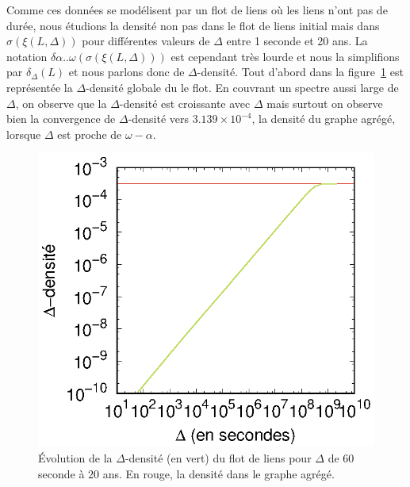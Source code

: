 Comme ces données se modélisent par un flot de liens où les liens n'ont pas de durée, nous étudions la densité non pas dans le flot de liens initial mais dans $\sigma(\xi(L,\Delta))$ pour différentes valeurs de $\Delta$ entre 1 seconde et 20 ans.
La notation $\delta{\alpha..\omega}(\sigma(\xi(L,\Delta)))$ est cependant très lourde et nous la simplifions par $\delta_{\Delta}(L)$ et nous parlons donc de $\Delta$-densité.
Tout d'abord dans la figure~\ref{fig:dens_fil_discusion} est représentée la $\Delta$-densité globale du le flot.
En couvrant un spectre aussi large de $\Delta$, on observe que la $\Delta$-densité est croissante avec $\Delta$ mais surtout on observe bien la convergence de $\Delta$-densité vers $3.139\times 10^{-4}$, la densité du graphe agrégé, lorsque $\Delta$ est proche de $\omega - \alpha$.

\begin{figure}
	\centering
	\includegraphics[width=0.4\linewidth]{img/mailing/global_loglog.eps}
	\caption{Évolution de la $\Delta$-densité (en vert) du flot de liens pour $\Delta$ de $60$ seconde à $20$ ans. En rouge, la densité dans le graphe agrégé.}
	\label{fig:dens_fil_discusion}
\end{figure}

